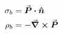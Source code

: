 

\vspace*{\fill}
\centering

\begin{align*}
    \sigma_{b} &= \va*{P} \vdot \vu*{n} \\ 
    \rho_{b} &= - \grad \cross \va*{P}
\end{align*}

\centering
\vspace*{\fill}

